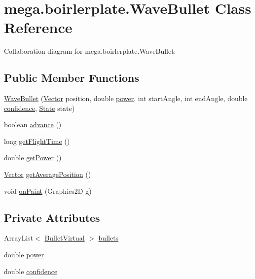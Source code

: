 \hypertarget{classmega_1_1boirlerplate_1_1_wave_bullet}{}\section{mega.\+boirlerplate.\+Wave\+Bullet Class Reference}
\label{classmega_1_1boirlerplate_1_1_wave_bullet}


Collaboration diagram for mega.\+boirlerplate.\+Wave\+Bullet\+:
\subsection*{Public Member Functions}
\begin{DoxyCompactItemize}
\item 
\hyperlink{classmega_1_1boirlerplate_1_1_wave_bullet_a2094f81ade6bca5e86e6b00dd8f48476}{Wave\+Bullet} (\hyperlink{classmega_1_1boirlerplate_1_1_vector}{Vector} position, double \hyperlink{classmega_1_1boirlerplate_1_1_wave_bullet_a8422491b39fbed8ad80e60771a18d874}{power}, int start\+Angle, int end\+Angle, double \hyperlink{classmega_1_1boirlerplate_1_1_wave_bullet_a2f18f8028e213b6e7d418f12d14e49bb}{confidence}, \hyperlink{classmega_1_1boirlerplate_1_1_state}{State} state)
\item 
boolean \hyperlink{classmega_1_1boirlerplate_1_1_wave_bullet_a5014821e51596d5de8fba56c9018151a}{advance} ()
\item 
long \hyperlink{classmega_1_1boirlerplate_1_1_wave_bullet_a5f1ba57af79ce9805f485f6a48f8dab5}{get\+Flight\+Time} ()
\item 
double \hyperlink{classmega_1_1boirlerplate_1_1_wave_bullet_ae302b671d2642dff9d4ff65032b415e2}{get\+Power} ()
\item 
\hyperlink{classmega_1_1boirlerplate_1_1_vector}{Vector} \hyperlink{classmega_1_1boirlerplate_1_1_wave_bullet_a86a07c0211d4f3c181f16490f878154c}{get\+Average\+Position} ()
\item 
void \hyperlink{classmega_1_1boirlerplate_1_1_wave_bullet_ad9d1a8f6a2058d1192dea650aa3d17f8}{on\+Paint} (Graphics2D g)
\end{DoxyCompactItemize}
\subsection*{Private Attributes}
\begin{DoxyCompactItemize}
\item 
Array\+List$<$ \hyperlink{classmega_1_1boirlerplate_1_1_bullet_virtual}{Bullet\+Virtual} $>$ \hyperlink{classmega_1_1boirlerplate_1_1_wave_bullet_a26da8c37f3ae2820d9cf938b4fd2af0f}{bullets}
\item 
double \hyperlink{classmega_1_1boirlerplate_1_1_wave_bullet_a8422491b39fbed8ad80e60771a18d874}{power}
\item 
double \hyperlink{classmega_1_1boirlerplate_1_1_wave_bullet_a2f18f8028e213b6e7d418f12d14e49bb}{confidence}
\end{DoxyCompactItemize}


